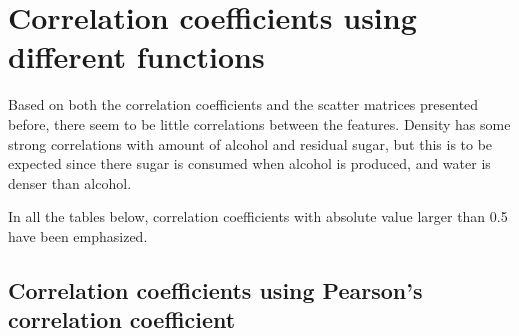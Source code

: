 \documentclass{report}
\begin{document}
\newpage

\section{Correlation coefficients using different functions}
\label{ccs}
Based on both the correlation coefficients and the scatter matrices presented before, there seem to be little correlations between the features. Density has some strong correlations with amount of alcohol and residual sugar, but this is to be expected since there sugar is consumed when alcohol is produced, and water is denser than alcohol.

In all the tables below, correlation coefficients with absolute value larger than 0.5 have been emphasized.
\subsection{Correlation coefficients using Pearson's correlation coefficient}
\end{document}
